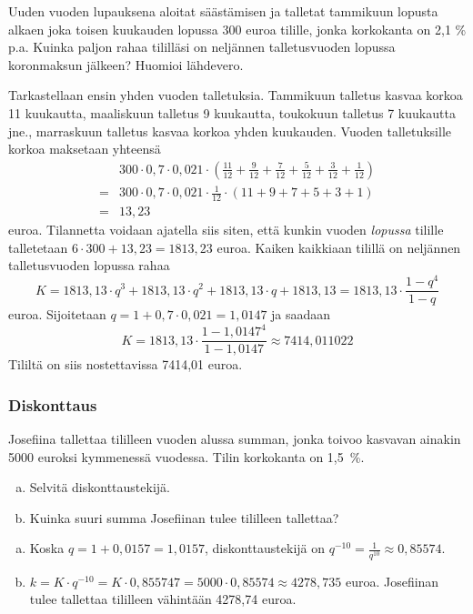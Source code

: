 \documentclass[a4paper,10pt]{article}\usepackage[]{graphicx}\usepackage[]{color}
\begin{document}
\begin{question} Uuden vuoden lupauksena aloitat säästämisen ja talletat tammikuun lopusta alkaen joka toisen kuukauden lopussa 300 euroa tilille,
jonka korkokanta on 2{,}1 \% p.a. Kuinka paljon rahaa tililläsi on neljännen talletusvuoden lopussa koronmaksun jälkeen? Huomioi lähdevero.
\end{question}\begin{solution}
Tarkastellaan ensin yhden vuoden talletuksia. Tammikuun talletus kasvaa korkoa 11 kuukautta, maaliskuun talletus 9 kuukautta,
toukokuun talletus 7 kuukautta jne., marraskuun talletus kasvaa korkoa yhden kuukauden. Vuoden talletuksille korkoa maksetaan yhteensä
\begin{align*}
    &300\cdot0,7\cdot0,021\cdot\left(\frac{11}{12} + \frac{9}{12} + \frac{7}{12} + \frac{5}{12} + \frac{3}{12} + \frac{1}{12}\right)\\
    =&300\cdot0,7\cdot0,021\cdot\frac{1}{12}\cdot(11+9+7+5+3+1)\\
    =& 13,23
\end{align*}
euroa. Tilannetta voidaan ajatella siis siten, että kunkin vuoden \emph{lopussa} tilille talletetaan \(6\cdot300+13,23 = 1813,23\) euroa.
Kaiken kaikkiaan tilillä on neljännen talletusvuoden lopussa rahaa
\[
    K = 1813,13\cdot q^3 + 1813,13\cdot q^2 + 1813,13\cdot q + 1813,13 = 1813,13\cdot\frac{1-q^4}{1-q}
\]
euroa. Sijoitetaan \(q = 1 + 0,7\cdot0,021 = 1,0147\) ja saadaan
\[
    K = 1813,13\cdot\frac{1-1,0147^4}{1-1,0147} \approx 7414,011022
\]
Tililtä on siis nostettavissa 7414,01 euroa.
\end{solution}

\subsubsection*{Diskonttaus}

\begin{question} Josefiina tallettaa tililleen vuoden alussa summan, jonka toivoo kasvavan ainakin 5000 euroksi kymmenessä vuodessa. Tilin korkokanta on 1,5~\%.
\begin{enumerate}[(a)]
    \item Selvitä diskonttaustekijä.
    \item Kuinka suuri summa Josefiinan tulee tililleen tallettaa?
\end{enumerate}
\end{question}\begin{solution}
    \begin{enumerate}[(a)]
        \item Koska \(q = 1 + 0,0157 = 1,0157\), diskonttaustekijä on \(q^{-10} = \frac{1}{q^{10}}\approx 0,85574\).
        \item \(k = K\cdot q^{-10} = K\cdot 0,855747 = 5000\cdot 0,85574 \approx 4278,735\) euroa.
        Josefiinan tulee tallettaa tililleen vähintään 4278,74 euroa.
    \end{enumerate}
\end{solution}
\end{document}
